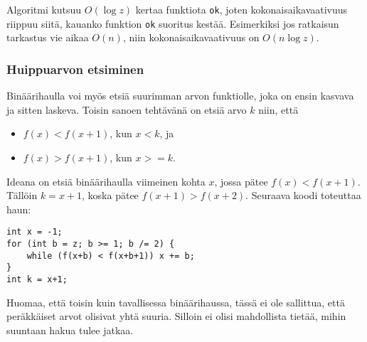 Algoritmi kutsuu $O(\log z)$ kertaa funktiota
\texttt{ok}, joten kokonaisaikavaativuus
riippuu siitä, kauanko funktion \texttt{ok}
suoritus kestää.
Esimerkiksi jos ratkaisun tarkastus
vie aikaa $O(n)$, niin kokonaisaikavaativuus
on $O(n \log z)$.

\subsubsection{Huippuarvon etsiminen}

Binäärihaulla voi myös etsiä
suurimman arvon funktiolle,
joka on ensin kasvava ja sitten laskeva.
Toisin sanoen tehtävänä on etsiä arvo
$k$ niin, että

\begin{itemize}
\item
$f(x)<f(x+1)$, kun $x<k$, ja
\item
$f(x)>f(x+1)$, kun $x >= k$.
\end{itemize}

Ideana on etsiä binäärihaulla
viimeinen kohta $x$,
jossa pätee $f(x)<f(x+1)$.
Tällöin $k=x+1$,
koska pätee $f(x+1)>f(x+2)$.
Seuraava koodi toteuttaa haun: 

\begin{lstlisting}
int x = -1;
for (int b = z; b >= 1; b /= 2) {
    while (f(x+b) < f(x+b+1)) x += b;
}
int k = x+1;
\end{lstlisting}

Huomaa, että toisin kuin tavallisessa binäärihaussa,
tässä ei ole sallittua,
että peräkkäiset arvot olisivat yhtä suuria.
Silloin ei olisi mahdollista tietää,
mihin suuntaan hakua tulee jatkaa.



